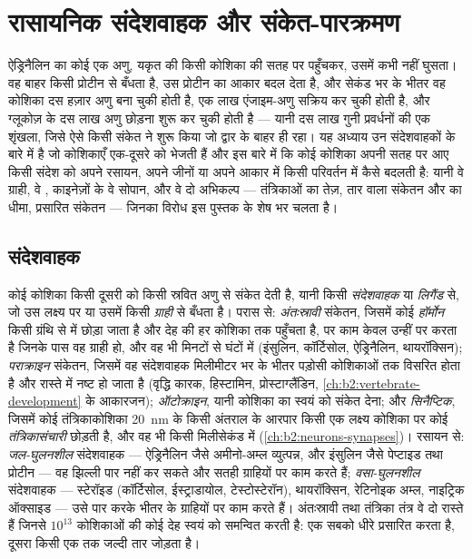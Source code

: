 \chapter{रासायनिक संदेशवाहक और संकेत-पारक्रमण}\label{ch:b2:cell-signalling}

ऐड्रिनैलिन का कोई एक अणु, यकृत की किसी कोशिका की सतह पर पहुँचकर,
उसमें कभी नहीं घुसता। वह बाहर किसी प्रोटीन से बँधता है, उस
प्रोटीन का आकार बदल देता है, और सेकंड भर के भीतर वह कोशिका दस
हज़ार अणु  बना चुकी होती है, एक लाख
एंजाइम-अणु सक्रिय कर चुकी होती है, और ग्लूकोज़ के दस लाख अणु
छोड़ना शुरू कर चुकी होती है --- यानी दस लाख गुनी प्रवर्धनों की एक शृंखला, जिसे
ऐसे किसी संकेत ने शुरू किया जो द्वार के बाहर ही रहा। यह अध्याय उन
संदेशवाहकों के बारे में है जो कोशिकाएँ एक-दूसरे को भेजती हैं और इस बारे में कि कोई कोशिका अपनी
सतह पर आए किसी संदेश को अपने रसायन, अपने जीनों या अपने
आकार में किसी परिवर्तन में कैसे बदलती है: यानी वे ग्राही, वे , काइनेज़ों के वे
सोपान, और वे दो अभिकल्प --- तंत्रिकाओं का तेज़, तार वाला संकेतन
और  का धीमा, प्रसारित संकेतन --- जिनका विरोध
इस पुस्तक के शेष भर चलता है।

\section{संदेशवाहक}

\begin{definition}[रासायनिक संकेतन के प्रकार]\label{def:b2:cell-signalling:kinds}
कोई कोशिका किसी दूसरी को किसी स्रवित अणु से संकेत देती है, यानी किसी
\emph{संदेशवाहक} या \emph{लिगैंड} से, जो उस लक्ष्य पर या उसमें किसी \emph{ग्राही} से
बँधता है। परास से: \emph{अंतःस्रावी} संकेतन, जिसमें कोई
\emph{हॉर्मोन} किसी ग्रंथि से  में छोड़ा जाता है और देह की
हर कोशिका तक पहुँचता है, पर काम केवल उन्हीं पर करता है जिनके पास वह ग्राही हो,
और वह भी मिनटों से घंटों में (इंसुलिन, कॉर्टिसोल, ऐड्रिनैलिन, थायरॉक्सिन);
\emph{पराक्राइन} संकेतन, जिसमें वह संदेशवाहक मिलीमीटर भर के भीतर
पड़ोसी कोशिकाओं तक विसरित होता है और रास्ते में नष्ट हो जाता है
(वृद्धि कारक, हिस्टामिन, प्रोस्टाग्लैंडिन,
\cref{ch:b2:vertebrate-development} के आकारजन); \emph{ऑटोक्राइन}, यानी कोशिका का
स्वयं को संकेत देना; और \emph{सिनैप्टिक}, जिसमें कोई तंत्रिकाकोशिका
\qty{20}{nm} के किसी अंतराल के आरपार किसी एक लक्ष्य कोशिका पर कोई \emph{तंत्रिकासंचारी} छोड़ती है,
और वह भी किसी मिलीसेकंड में (\cref{ch:b2:neurons-synapses})।
रसायन से: \emph{जल-घुलनशील} संदेशवाहक --- ऐड्रिनैलिन जैसे अमीनो-अम्ल
व्युत्पन्न, और इंसुलिन जैसे पेप्टाइड तथा प्रोटीन --- वह
झिल्ली पार नहीं कर सकते और सतही ग्राहियों पर काम करते हैं;
\emph{वसा-घुलनशील} संदेशवाहक --- स्टेरॉइड (कॉर्टिसोल,
ईस्ट्राडायोल, टेस्टोस्टेरॉन), थायरॉक्सिन, रेटिनोइक अम्ल, नाइट्रिक ऑक्साइड ---
उसे पार करके भीतर के ग्राहियों पर काम करते हैं। अंतःस्रावी तथा तंत्रिका
तंत्र वे दो रास्ते हैं जिनसे $10^{13}$ कोशिकाओं की कोई देह स्वयं को
समन्वित करती है: एक सबको धीरे प्रसारित करता है, दूसरा
किसी एक तक जल्दी तार जोड़ता है।
\end{definition}

